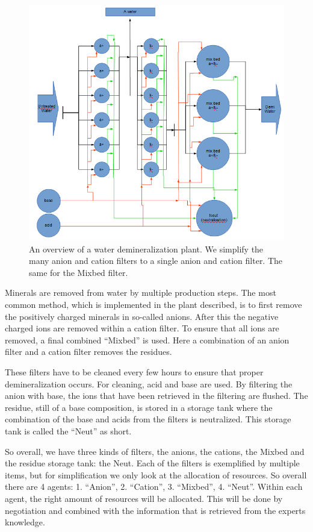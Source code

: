 \begin{figure}[h]
	\centering
	\includegraphics[width=1\linewidth]{img/demi-plant}
	\caption{An overview of a water demineralization plant. We simplify the many anion and cation filters to a single anion and cation filter. The same for the Mixbed filter.}
	\label{fig:demi-plant}
\end{figure}

Minerals are removed from water by multiple production steps. The most common method, which is implemented in the plant described, is to first remove the positively charged minerals in so-called anions. After this the negative charged ions are removed within a cation filter. To ensure that all ions are removed, a final combined ``Mixbed'' is used. Here a combination of an anion filter and a cation filter removes the residues.

These filters have to be cleaned every few hours to ensure that proper demineralization occurs. For cleaning, acid and base are used. By filtering the anion with base, the ions that have been retrieved in the filtering are flushed. The residue, still of a base composition, is stored in a storage tank where the combination of the base and acids from the filters is neutralized. This storage tank is called the ``Neut'' as short.

So overall, we have three kinds of filters, the anions, the cations, the Mixbed and the residue storage tank: the Neut. Each of the filters is exemplified by multiple items, but for simplification we only look at the allocation of resources. So overall there are 4 agents: 1. ``Anion'', 2. ``Cation'', 3. ``Mixbed'', 4. ``Neut''. Within each agent, the right amount of resources will be allocated. This will be done by negotiation and combined with the information that is retrieved from the experts knowledge.


